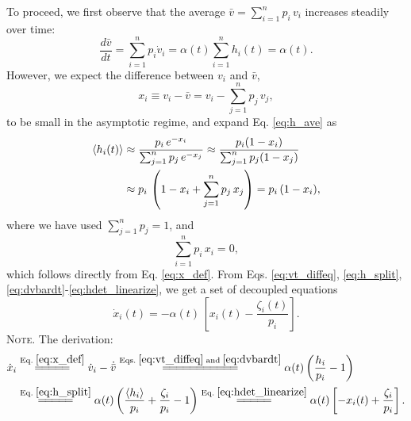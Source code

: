 \documentclass[reprint, floatfix]{revtex4-1}
\newcommand{\note}[1]{{\color{DarkGreen}\footnotesize \textsc{Note.} #1}}
\begin{document}
To proceed, we first observe that
the average $\bar v = \sum_{i = 1}^n p_i \, v_i$
increases steadily over time:
%
\begin{equation}
\frac{ d \bar v } { d t }
=
\sum_{i = 1}^n p_i \dot v_i
=
\alpha(t) \sum_{i = 1}^n h_i(t) = \alpha(t).
\label{eq:dvbardt}
\end{equation}
%
However, we expect the difference between $v_i$ and $\bar v$,
%
\begin{equation}
  x_i \equiv v_i - \bar v = v_i - \sum_{j = 1}^n p_j \, v_j,
  \label{eq:x_def}
\end{equation}
%
to be small in the asymptotic regime,
and expand Eq. \eqref{eq:h_ave} as
%
\begin{align}
\langle h_i(t) \rangle
&\approx
\frac{                 p_i \, e^{- x_i} }
     { \sum_{ j = 1}^n p_j \, e^{- x_j} }
\approx
\frac{                 p_i (1 - x_i) }
     { \sum_{ j = 1}^n p_j (1 - x_j) }
\notag
\\
&\approx
p_i \, \left(
         1 - x_i + \sum_{j=1}^n p_j \, x_j
       \right)
=
p_i \, (1 - x_i),
\label{eq:hdet_linearize}
\end{align}
%
where we have used $\sum_{j=1}^n p_j = 1$,
and
%
\begin{equation}
  \sum_{i = 1}^n p_i \, x_i = 0,
  \label{eq:px_sum}
\end{equation}
which follows directly from Eq. \eqref{eq:x_def}.
%
From Eqs.
\eqref{eq:vt_diffeq},
\eqref{eq:h_split},
\eqref{eq:dvbardt}-\eqref{eq:hdet_linearize},
we get a set of decoupled equations
%
\begin{equation}
  \dot x_i(t)
  =
  -\alpha(t) \, \left[ x_i(t) - \frac{ \zeta_i(t) } { p_i } \right].
  \label{eq:dxdt_WL}
\end{equation}
\note{The derivation:
$$
\begin{aligned}
  \dot x_i
  &\stackrel{\mathrm{Eq.\; \eqref{eq:x_def}}}
            {=\joinrel=\joinrel=\joinrel=\joinrel=}
  \dot v_i - \dot{ \bar v }
  \stackrel{\mathrm{Eqs.\; \eqref{eq:vt_diffeq}\; and\; \eqref{eq:dvbardt}}}
            {=\joinrel=\joinrel=\joinrel=\joinrel=\joinrel=\joinrel=\joinrel=\joinrel=\joinrel=\joinrel=}
  \alpha(t) \left( \frac{ h_i } { p_i } - 1 \right)
  \\
  &\stackrel{\mathrm{Eq.\; \eqref{eq:h_split}}}
            {=\joinrel=\joinrel=\joinrel=\joinrel=}
  \alpha(t) \left( \frac{ \langle h_i \rangle } { p_i } + \frac{ \zeta_i } { p_i } - 1 \right)
  \stackrel{\mathrm{Eq.\; \eqref{eq:hdet_linearize}}}
            {=\joinrel=\joinrel=\joinrel=\joinrel=}
  \alpha(t) \left[ -x_i(t) + \frac{ \zeta_i } { p_i } \right].
\end{aligned}
$$
}
\end{document}
